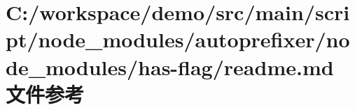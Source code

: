 \hypertarget{node__modules_2autoprefixer_2node__modules_2has-flag_2_r_e_a_d_m_e_8md}{}\section{C\+:/workspace/demo/src/main/script/node\+\_\+modules/autoprefixer/node\+\_\+modules/has-\/flag/readme.md 文件参考}
\label{node__modules_2autoprefixer_2node__modules_2has-flag_2_r_e_a_d_m_e_8md}
